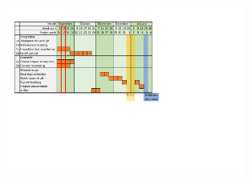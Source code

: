\documentclass[11pt]{report}
\numberwithin{equation}{section}        %
\numberwithin{figure}{section}          %
\numberwithin{table}{section}           %
\begin{document}
  \begin{figure}[H]
  \centering
  \includegraphics[width=0.7\textwidth, trim={0.87cm 9.5cm 10cm 1.5cm},clip]{graphics/planning v2.pdf}

  \label{fig:my_label}
  \end{figure}
\end{document}

